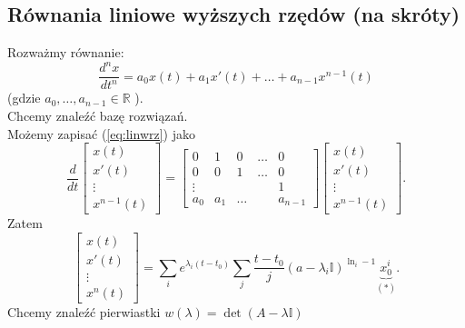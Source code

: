 \documentclass[../main.tex]{subfiles}
\begin{document}
        \subsection{Równania liniowe wyższych rzędów (na skróty)}
        Rozważmy równanie:
        \begin{equation}
            \label{eq:linwrz}
            \frac{d^n x}{dt^n} = a_0x(t) + a_1x'(t) + \ldots + a_{n-1}x^{n-1}(t)
        \end{equation}
        (gdzie $a_0,\ldots,a_{n-1}\in \mathbb{R}$ ).\\
        Chcemy znaleźć bazę rozwiązań.\\
        Możemy zapisać  (\ref{eq:linwrz}) jako
         \[
             \frac{d}{dt} \begin{bmatrix} x(t)\\ x'(t) \\ \vdots \\ x^{n-1}(t) \end{bmatrix} = \begin{bmatrix} 0&1&0&\ldots&0
         \\ 0&0&1&\ldots&0
         \\ \vdots &&&&1\\
     a_0 & a_1 & \ldots && a_{n-1}\end{bmatrix}
     \begin{bmatrix} x(t) \\ x'(t) \\ \vdots \\ x^{n-1}(t) \end{bmatrix}
        .\]
        Zatem
        \[
            \begin{bmatrix}  x(t) \\ x'(t) \\ \vdots \\ x^n(t) \end{bmatrix} = \sum_i e^{\lambda_i(t-t_0)} \sum_j \frac{t-t_0}{j}(a-\lambda_i \mathbb{I})^{\ln_i - 1}\underbrace{x_0^i}_{(*)}
        .\]
        Chcemy znaleźć pierwiastki $w(\lambda) = \det(A - \lambda \mathbb{I})$
\end{document}
